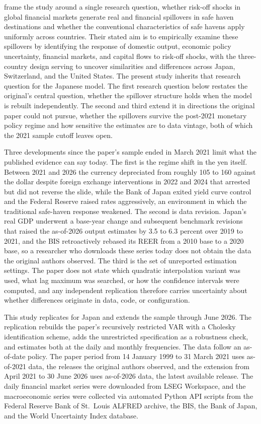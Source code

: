 \textcite{beirne_sugandi_2023} frame the study around a single research question, whether risk-off shocks in global financial markets generate real and financial spillovers in safe haven destinations and whether the conventional characteristics of safe havens apply uniformly across countries. Their stated aim is to empirically examine these spillovers by identifying the response of domestic output, economic policy uncertainty, financial markets, and capital flows to risk-off shocks, with the three-country design serving to uncover similarities and differences across Japan, Switzerland, and the United States. The present study inherits that research question for the Japanese model. The first research question below restates the original's central question, whether the spillover structure holds when the model is rebuilt independently. The second and third extend it in directions the original paper could not pursue, whether the spillovers survive the post-2021 monetary policy regime and how sensitive the estimates are to data vintage, both of which the 2021 sample cutoff leaves open.

Three developments since the paper's sample ended in March 2021 limit what the published evidence can say today. The first is the regime shift in the yen itself. Between 2021 and 2026 the currency depreciated from roughly 105 to 160 against the dollar despite foreign exchange interventions in 2022 and 2024 that arrested but did not reverse the slide, while the Bank of Japan exited yield curve control and the Federal Reserve raised rates aggressively, an environment in which the traditional safe-haven response weakened. The second is data revision. Japan's real GDP underwent a base-year change and subsequent benchmark revisions that raised the as-of-2026 output estimates by 3.5 to 6.3 percent over 2019 to 2021, and the BIS retroactively rebased its REER from a 2010 base to a 2020 base, so a researcher who downloads these series today does not obtain the data the original authors observed. The third is the set of unreported estimation settings. The paper does not state which quadratic interpolation variant was used, what lag maximum was searched, or how the confidence intervals were computed, and any independent replication therefore carries uncertainty about whether differences originate in data, code, or configuration.

This study replicates \textcite{beirne_sugandi_2023} for Japan and extends the sample through June 2026. The replication rebuilds the paper's recursively restricted VAR with a Cholesky identification scheme, adds the unrestricted specification as a robustness check, and estimates both at the daily and monthly frequencies. The data follow an as-of-date policy. The paper period from 14 January 1999 to 31 March 2021 uses as-of-2021 data, the releases the original authors observed, and the extension from April 2021 to 30 June 2026 uses as-of-2026 data, the latest available release. The daily financial market series were downloaded from LSEG Workspace, and the macroeconomic series were collected via automated Python API scripts from the Federal Reserve Bank of St.\ Louis ALFRED archive, the BIS, the Bank of Japan, and the World Uncertainty Index database.

